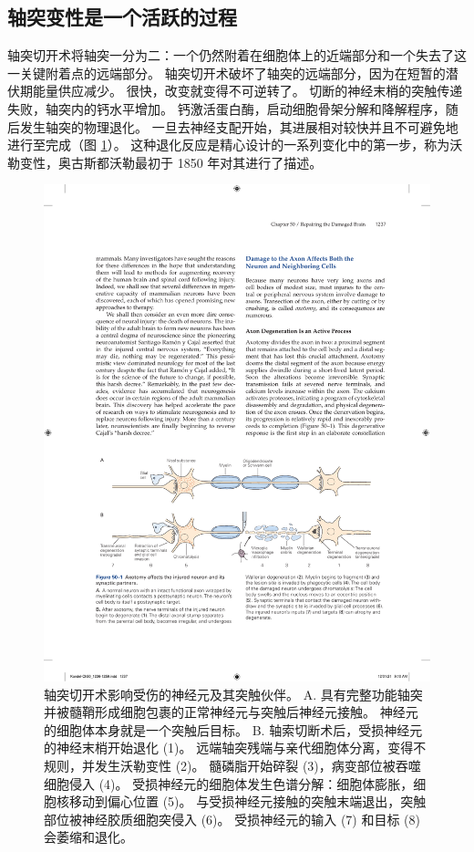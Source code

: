 \subsection{轴突变性是一个活跃的过程}
轴突切开术将轴突一分为二：一个仍然附着在细胞体上的近端部分和一个失去了这一关键附着点的远端部分。 轴突切开术破坏了轴突的远端部分，因为在短暂的潜伏期能量供应减少。 很快，改变就变得不可逆转了。 切断的神经末梢的突触传递失败，轴突内的钙水平增加。 钙激活蛋白酶，启动细胞骨架分解和降解程序，随后发生轴突的物理退化。 
一旦去神经支配开始，其进展相对较快并且不可避免地进行至完成（图 \ref{fig:50_1}）。 
这种退化反应是精心设计的一系列变化中的第一步，称为沃勒变性，奥古斯都沃勒最初于 1850 年对其进行了描述。

\begin{figure}[htbp]
	\centering
	\includegraphics[width=0.9\linewidth]{chap50/fig_50_1}
	\caption{轴突切开术影响受伤的神经元及其突触伙伴。 A. 具有完整功能轴突并被髓鞘形成细胞包裹的正常神经元与突触后神经元接触。 神经元的细胞体本身就是一个突触后目标。 B. 轴索切断术后，受损神经元的神经末梢开始退化 (1)。 远端轴突残端与亲代细胞体分离，变得不规则，并发生沃勒变性 (2)。 髓磷脂开始碎裂 (3)，病变部位被吞噬细胞侵入 (4)。 受损神经元的细胞体发生色谱分解：细胞体膨胀，细胞核移动到偏心位置 (5)。 与受损神经元接触的突触末端退出，突触部位被神经胶质细胞突侵入 (6)。 受损神经元的输入 (7) 和目标 (8) 会萎缩和退化。}
	\label{fig:50_1}
\end{figure}

